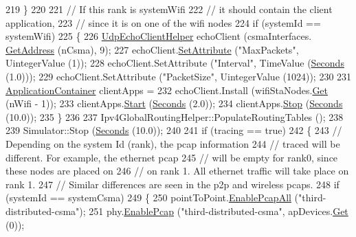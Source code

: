 \begin{DoxyCode}
219     \}
220 
221   \textcolor{comment}{// If this rank is systemWifi}
222   \textcolor{comment}{// it should contain the client application, }
223   \textcolor{comment}{// since it is on one of the wifi nodes}
224   \textcolor{keywordflow}{if} (systemId == systemWifi)
225     \{
226       \hyperlink{classns3_1_1UdpEchoClientHelper}{UdpEchoClientHelper} echoClient (csmaInterfaces.
      \hyperlink{classns3_1_1Ipv4InterfaceContainer_ae63208dcd222be986822937ee4aa828c}{GetAddress} (nCsma), 9);
227       echoClient.\hyperlink{classns3_1_1UdpEchoClientHelper_a11228c069ad896f8ed13f4d37c13f51d}{SetAttribute} (\textcolor{stringliteral}{"MaxPackets"}, UintegerValue (1));
228       echoClient.SetAttribute (\textcolor{stringliteral}{"Interval"}, TimeValue (\hyperlink{group__timecivil_ga33c34b816f8ff6628e33d5c8e9713b9e}{Seconds} (1.0)));
229       echoClient.SetAttribute (\textcolor{stringliteral}{"PacketSize"}, UintegerValue (1024));
230 
231       \hyperlink{classns3_1_1ApplicationContainer}{ApplicationContainer} clientApps = 
232         echoClient.Install (wifiStaNodes.\hyperlink{classns3_1_1NodeContainer_a9ed96e2ecc22e0f5a3d4842eb9bf90bf}{Get} (nWifi - 1));
233       clientApps.\hyperlink{classns3_1_1ApplicationContainer_a8eff87926507020bbe3e1390358a54a7}{Start} (\hyperlink{group__timecivil_ga33c34b816f8ff6628e33d5c8e9713b9e}{Seconds} (2.0));
234       clientApps.\hyperlink{classns3_1_1ApplicationContainer_adfc52f9aa4020c8714679b00bbb9ddb3}{Stop} (\hyperlink{group__timecivil_ga33c34b816f8ff6628e33d5c8e9713b9e}{Seconds} (10.0));
235     \}
236  
237   Ipv4GlobalRoutingHelper::PopulateRoutingTables ();
238 
239   Simulator::Stop (\hyperlink{group__timecivil_ga33c34b816f8ff6628e33d5c8e9713b9e}{Seconds} (10.0));
240 
241   \textcolor{keywordflow}{if} (tracing == \textcolor{keyword}{true})
242     \{
243       \textcolor{comment}{// Depending on the system Id (rank), the pcap information }
244       \textcolor{comment}{// traced will be different.  For example, the ethernet pcap}
245       \textcolor{comment}{// will be empty for rank0, since these nodes are placed on }
246       \textcolor{comment}{// on rank 1.  All ethernet traffic will take place on rank 1.}
247       \textcolor{comment}{// Similar differences are seen in the p2p and wireless pcaps.}
248       \textcolor{keywordflow}{if} (systemId == systemCsma)
249         \{
250           pointToPoint.\hyperlink{classns3_1_1PcapHelperForDevice_a4ab183a2512120200d4a0e5d8ececd49}{EnablePcapAll} (\textcolor{stringliteral}{"third-distributed-csma"});
251           phy.\hyperlink{classns3_1_1PcapHelperForDevice_a74866def9a881aa9d5c5be1225a26722}{EnablePcap} (\textcolor{stringliteral}{"third-distributed-csma"}, apDevices.\hyperlink{classns3_1_1NetDeviceContainer_a677d62594b5c9d2dea155cc5045f4d0b}{Get} (0));

\end{DoxyCode}
